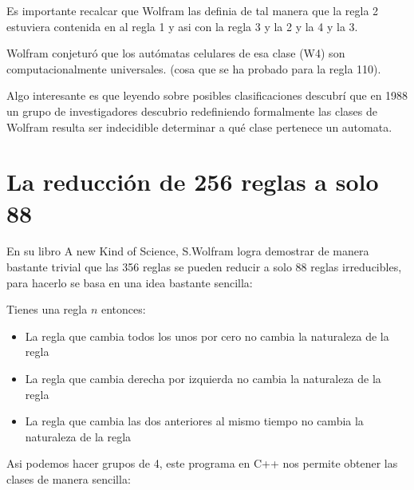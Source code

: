 \documentclass[12pt, fleqn]{report}                             %
\theoremstyle{break}                                            %
\begin{document}
      \cite{Kari}

      Es importante recalcar que Wolfram las definia de tal manera que la regla 2 estuviera
      contenida en al regla 1 y asi con la regla 3 y la 2 y la 4 y la 3.

      Wolfram conjeturó que los autómatas celulares de esa clase (W4) son computacionalmente universales.
      (cosa que se ha probado para la regla 110).


      Algo interesante es que leyendo sobre posibles clasificaciones descubrí que en 1988
      un grupo de investigadores descubrio  redefiniendo formalmente las clases de Wolfram
      resulta ser indecidible determinar a qué clase pertenece un automata. \cite{4}

  \chapter{La reducción de 256 reglas a solo 88}

      En su libro A new Kind of Science, S.Wolfram \cite{Wolfram} logra demostrar de manera bastante trivial
      que las 356 reglas se pueden reducir a solo 88 reglas irreducibles, para hacerlo se basa en una idea
      bastante sencilla:

      Tienes una regla $n$ entonces:
      \begin{itemize}
        \item La regla que cambia todos los unos por cero no cambia la naturaleza de la regla
        \item La regla que cambia derecha por izquierda no cambia la naturaleza de la regla
        \item La regla que cambia las dos anteriores al mismo tiempo no cambia la naturaleza de la regla
      \end{itemize}

      Asi podemos hacer grupos de 4, este programa en C++ nos permite obtener las clases de manera sencilla:
\end{document}
